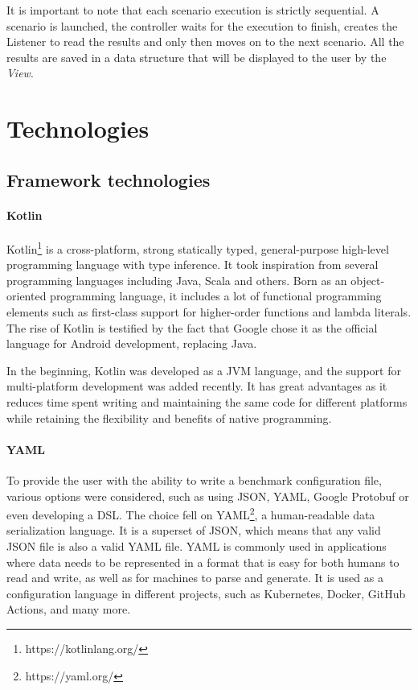 \documentclass[12pt,a4paper,openright,twoside]{book}
\begin{document}
It is important to note that each scenario execution is strictly sequential. A scenario is launched, the controller waits for the execution to finish, creates the Listener to read the results and only then moves on to the next scenario.
All the results are saved in a data structure that will be displayed to the user by the \emph{View}.

\section{Technologies}

\subsection*{Framework technologies}

\paragraph*{Kotlin}

Kotlin\footnote{https://kotlinlang.org/} is a cross-platform, strong statically typed, general-purpose high-level programming language with type inference.
It took inspiration from several programming languages including Java, Scala and others.
Born as an object-oriented programming language, it includes a lot of functional programming elements such as first-class support for higher-order functions and lambda literals.
The rise of Kotlin is testified by the fact that Google chose it as the official language for Android development, replacing Java.

In the beginning, Kotlin was developed as a JVM language, and the support for multi-platform development was added recently. 
It has great advantages as it reduces time spent writing and maintaining the same code for different platforms while retaining the flexibility and benefits of native programming.

\paragraph*{YAML}
To provide the user with the ability to write a benchmark configuration file, various options were considered, such as using JSON, YAML, Google Protobuf or even developing a DSL. 
The choice fell on YAML\footnote{https://yaml.org/}, a human-readable data serialization language. It is a superset of JSON, which means that any valid JSON file is also a valid YAML file.
YAML is commonly used in applications where data needs to be represented in a format that is easy for both humans to read and write, as well as for machines to parse and generate.
It is used as a configuration language in different projects, such as Kubernetes, Docker, GitHub Actions, and many more.
\end{document}
